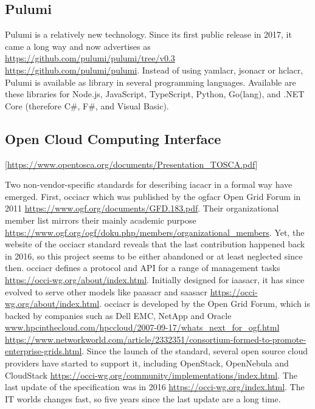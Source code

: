 \subsection{Pulumi}
Pulumi is a relatively new technology. Since its first public release in 2017, it came a long way and now advertises as  \url{https://github.com/pulumi/pulumi/tree/v0.3} \url{https://github.com/pulumi/pulumi}. Instead of using \gls{yamlacr}, \gls{jsonacr} or \gls{hclacr}, Pulumi is available as library in several programming languages. Available are these libraries for Node.js, JavaScript, TypeScript, Python, Go(lang), and .NET Core (therefore C\#, F\#, and Visual Basic).

\subsection{Open Cloud Computing Interface} %
[\url{https://www.opentosca.org/documents/Presentation\_TOSCA.pdf}]

Two non-vendor-specific standards for describing \gls{iacacr} in a formal way have emerged. First, \gls{occiacr} which was published by the \gls{ogfacr} Open Grid Forum in 2011 \url{https://www.ogf.org/documents/GFD.183.pdf}. Their organizational member list mirrors their mainly academic purpose \url{https://www.ogf.org/ogf/doku.php/members/organizational\_members}. Yet, the website of the \gls{occiacr} standard reveals that the last contribution happened back in 2016, so this project seems to be either abandoned or at least neglected since then.
\newline
\Gls{occiacr} defines a protocol and API for a range of management tasks \url{https://occi-wg.org/about/index.html}. Initially designed for \gls{iaasacr}, it has since evolved to serve other models like \gls{paasacr} and \gls{saasacr} \url{https://occi-wg.org/about/index.html}. \Gls{occiacr} is developed by the Open Grid Forum, which is backed by companies such as Dell EMC, NetApp and Oracle \url{www.hpcinthecloud.com/hpccloud/2007-09-17/whats_next_for_ogf.html} \url{https://www.networkworld.com/article/2332351/consortium-formed-to-promote-enterprise-grids.html}. Since the launch of the standard, several open source cloud providers have started to support it, including OpenStack, OpenNebula and CloudStack \url{https://occi-wg.org/community/implementations/index.html}. The last update of the specification was in 2016 \url{https://occi-wg.org/index.html}. The IT worlds changes fast, so five years since the last update are a long time.

